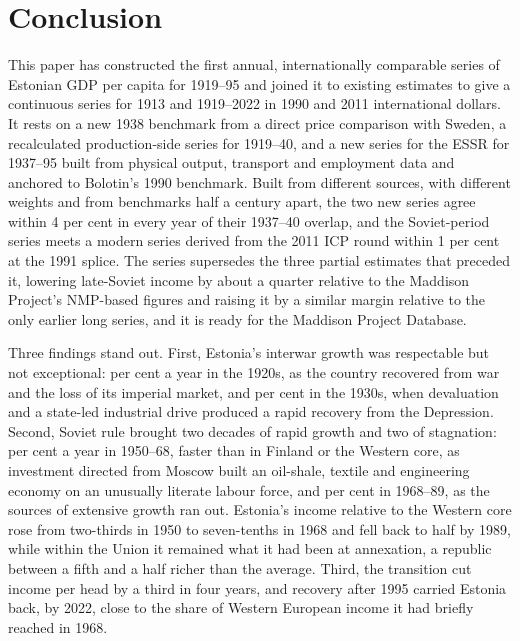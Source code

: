 \section{Conclusion}
\label{sec:conclusion}

This paper has constructed the first annual, internationally comparable series of Estonian GDP per capita for 1919--95 and joined it to existing estimates to give a continuous series for 1913 and 1919--2022 in 1990 and 2011 international dollars. It rests on a new 1938 benchmark from a direct price comparison with Sweden, a recalculated production-side series for 1919--40, and a new series for the ESSR for 1937--95 built from physical output, transport and employment data and anchored to Bolotin's 1990 benchmark. Built from different sources, with different weights and from benchmarks half a century apart, the two new series agree within 4 per cent in every year of their 1937--40 overlap, and the Soviet-period series meets a modern series derived from the 2011 ICP round within 1 per cent at the 1991 splice. The series supersedes the three partial estimates that preceded it, lowering late-Soviet income by about a quarter relative to the Maddison Project's NMP-based figures and raising it by a similar margin relative to the only earlier long series, and it is ready for the Maddison Project Database.

Three findings stand out. First, Estonia's interwar growth was respectable but not exceptional:  per cent a year in the 1920s, as the country recovered from war and the loss of its imperial market, and  per cent in the 1930s, when devaluation and a state-led industrial drive produced a rapid recovery from the Depression. Second, Soviet rule brought two decades of rapid growth and two of stagnation:  per cent a year in 1950--68, faster than in Finland or the Western core, as investment directed from Moscow built an oil-shale, textile and engineering economy on an unusually literate labour force, and  per cent in 1968--89, as the sources of extensive growth ran out. Estonia's income relative to the Western core rose from two-thirds in 1950 to seven-tenths in 1968 and fell back to half by 1989, while within the Union it remained what it had been at annexation, a republic between a fifth and a half richer than the average. Third, the transition cut income per head by a third in four years, and recovery after 1995 carried Estonia back, by 2022, close to the share of Western European income it had briefly reached in 1968.

